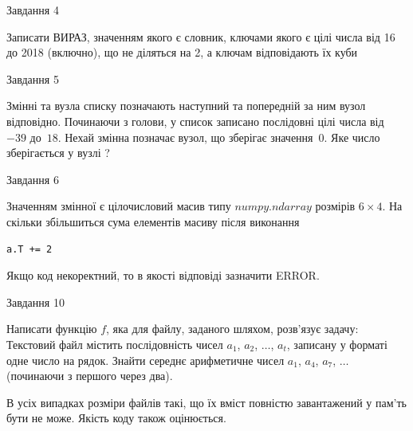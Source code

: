 \documentclass[12pt, ukrainian]{article}
\begin{document}
{\begin{minipage}[t]{8.0cm}
\end{minipage}


               
{\begin{center}Завдання {4}\end{center}}
\vspace{-4mm}
Записати ВИРАЗ, значенням якого є словник, ключами якого є цілі числа від 16 до 2018 (включно), що не діляться на 2, а ключам відповідають їх куби\par

\vspace{10mm}
               
{\begin{center}Завдання {5}\end{center}}
\vspace{-4mm}
Змінні  та  вузла списку позначають наступний та попередній за ним вузол відповідно. Починаючи з голови, у список записано послідовні цілі числа від~$-39$ до~$18$. Нехай змінна  позначає вузол, що зберігає значення~$0$.
Яке число зберігається у вузлі  ?\par

               
{\begin{center}Завдання {6}\end{center}}
\vspace{-4mm}
Значенням змінної  є цілочисловий масив типу $numpy.ndarray$ розмірів $6{\times}4$. На скільки збільшиться сума елементів масиву  після виконання
\begin{verbatim}
a.T += 2
\end{verbatim}


Якщо код некоректний, то в якості відповіді зазначити ERROR.\par

               
{\begin{center}Завдання {10}\end{center}}
\vspace{-4mm}

Написати функцію $f$, яка для файлу, заданого шляхом, розв’язує задачу:\\ Текстовий файл містить послідовність чисел $a_1$, $a_2$, $\ldots$, $a_t$, записану у форматі одне число на рядок. Знайти середнє арифметичне чисел $a_1$, $a_4$, $a_7$, $\ldots$ (починаючи з першого через два).

В усіх випадках розміри файлів такі, що їх вміст повністю завантажений у пам'ть бути не може. Якість коду також оцінюється.



}
\end{document}

